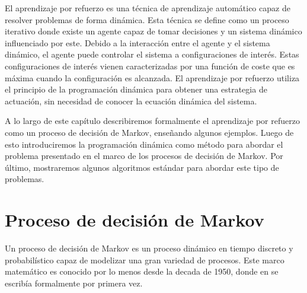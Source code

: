 
El aprendizaje por refuerzo es una técnica de aprendizaje automático capaz de resolver problemas de forma dinámica.
Esta técnica se define como un proceso iterativo donde existe un agente capaz de tomar decisiones y un sistema dinámico influenciado por este.
Debido a la interacción entre el agente y el sistema dinámico, el agente  puede controlar el sistema a configuraciones de interés. Estas  configuraciones de interés vienen caracterizadas por una función de coste que es máxima cuando la configuración es alcanzada. 
% 
%
%
El aprendizaje por refuerzo utiliza el principio de la programación dinámica para obtener una estrategia de actuación, sin necesidad de conocer la ecuación dinámica del sistema.
\newline

A lo largo de este capítulo describiremos formalmente el aprendizaje por refuerzo como un proceso de decisión de Markov, enseñando algunos ejemplos. 
%
Luego de esto introduciremos la programación dinámica como método para abordar el problema presentado en el marco de los procesos de decisión de Markov. 
%
Por último, mostraremos algunos algoritmos estándar para abordar este tipo de problemas.

\section{Proceso de decisión de Markov}

Un proceso de decisión de Markov es un proceso dinámico en tiempo discreto y probabilístico capaz de modelizar una gran variedad de procesos. 
%
Este marco matemático es conocido por lo menos desde la decada de 1950, donde en \cite{bellman1957theory} se escribía formalmente por primera vez.

